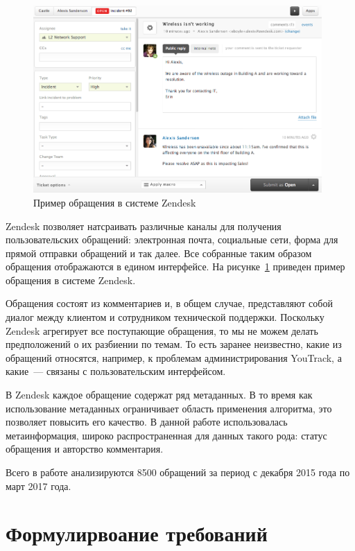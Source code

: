 \begin{figure}[tph!]
\centerline{\includegraphics[width=11cm]{fig/zendesk2.png}}
    \caption{Пример обращения в системе Zendesk}
    \label{fig:zdesk_ticket}
\end{figure}

Zendesk позволяет натсраивать различные каналы для получения пользовательских обращений: электронная почта, социальные сети, форма для прямой отправки обращений и так далее. Все собранные таким образом обращения отображаются в едином интерфейсе. На рисунке~\ref{fig:zdesk_ticket} приведен пример обращения в системе Zendesk. 

Обращения состоят из комментариев и, в общем случае, представляют собой диалог между клиентом и сотрудником технической поддержки. Поскольку Zendesk агрегирует все поступающие  обращения, то мы не можем делать предположений о их разбиении по темам. То есть заранее неизвестно, какие из обращений относятся, например, к проблемам администрирования YouTrack, а какие~--- связаны с пользовательским интерфейсом.

В Zendesk каждое обращение содержат ряд метаданных. В то время как использование метаданных ограничивает область применения алгоритма, это позволяет повысить его качество. В данной работе использовалась метаинформация, широко распространенная для данных такого рода: статус обращения и авторство комментария.

Всего в работе анализируются 8500 обращений за период с декабря 2015 года по март 2017 года. 

\section{Формулирвоание требований}
\label{sec:features}

